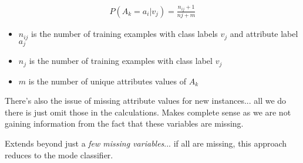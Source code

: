 \documentclass{article}
\begin{document}
\begin{align*}
P(A_k = a_i | v_j) = \frac{n_{ij} + 1}{nj + m} 
\end{align*}

\begin{itemize}
	\item $n_{ij}$ is the number of training examples with class labels $v_j$ and attribute label $a_j$
	\item $n_j$ is the number of training examples with class label $v_j$
	\item $m$ is the number of unique attributes values of $A_k$
\end{itemize}

There's also the issue of missing attribute values for new instances... all we do there is just omit those in the calculations. Makes complete sense as we are not gaining information from the fact that these variables are missing.

Extends beyond just a {\em few missing variables}... if all are missing, this approach reduces to the mode classifier.
\end{document}
